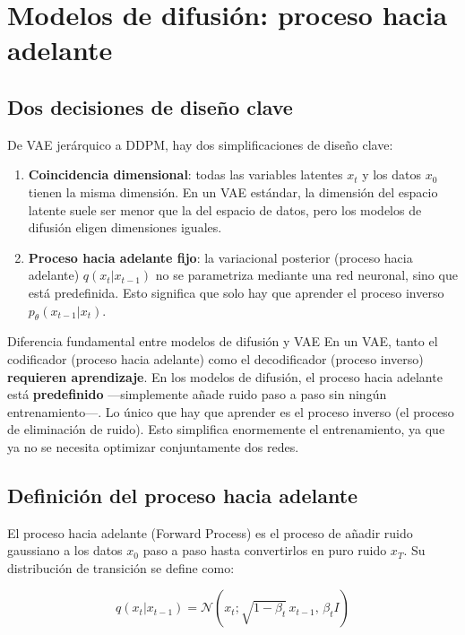 \section{Modelos de difusión: proceso hacia adelante}

\subsection{Dos decisiones de diseño clave}

De VAE jerárquico a DDPM, hay dos simplificaciones de diseño clave:

\begin{enumerate}
    \item \textbf{Coincidencia dimensional}: todas las variables latentes $x_t$ y los datos $x_0$ tienen la misma dimensión. En un VAE estándar, la dimensión del espacio latente suele ser menor que la del espacio de datos, pero los modelos de difusión eligen dimensiones iguales.
    \item \textbf{Proceso hacia adelante fijo}: la variacional posterior (proceso hacia adelante) $q(x_t|x_{t-1})$ no se parametriza mediante una red neuronal, sino que está predefinida. Esto significa que solo hay que aprender el proceso inverso $p_\theta(x_{t-1}|x_t)$.
\end{enumerate}

\begin{importantbox}{Diferencia fundamental entre modelos de difusión y VAE}
En un VAE, tanto el codificador (proceso hacia adelante) como el decodificador (proceso inverso) \textbf{requieren aprendizaje}. En los modelos de difusión, el proceso hacia adelante está \textbf{predefinido} —simplemente añade ruido paso a paso sin ningún entrenamiento—. Lo único que hay que aprender es el proceso inverso (el proceso de eliminación de ruido). Esto simplifica enormemente el entrenamiento, ya que ya no se necesita optimizar conjuntamente dos redes.
\end{importantbox}

\subsection{Definición del proceso hacia adelante}

El proceso hacia adelante (Forward Process) es el proceso de añadir ruido gaussiano a los datos $x_0$ paso a paso hasta convertirlos en puro ruido $x_T$. Su distribución de transición se define como:

$$q(x_t | x_{t-1}) = \mathcal{N}(x_t; \sqrt{1 - \beta_t} \, x_{t-1}, \, \beta_t I)$$

